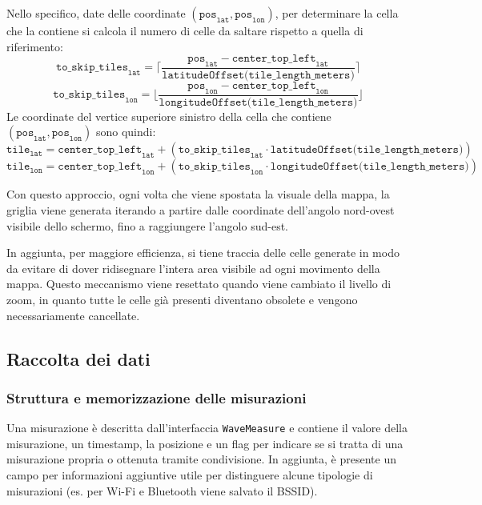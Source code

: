 \documentclass[11pt]{article}
\begin{document}
Nello specifico, date delle coordinate $(\texttt{pos}_{\texttt{lat}}, \texttt{pos}_{\texttt{lon}})$, per determinare la cella che la contiene si calcola il numero di celle da saltare rispetto a quella di riferimento: 
\begin{equation*}
    \texttt{to\_skip\_tiles}_\texttt{lat} =
        \lceil \frac{\texttt{pos}_{\texttt{lat}} - \texttt{center\_top\_left}_{\texttt{lat}}}{\texttt{latitudeOffset(tile\_length\_meters)}} \rceil
\end{equation*}
\begin{equation*}
    \texttt{to\_skip\_tiles}_\texttt{lon} =
        \lfloor \frac{\texttt{pos}_{\texttt{lon}} - \texttt{center\_top\_left}_{\texttt{lon}}}{\texttt{longitudeOffset(tile\_length\_meters)}} \rfloor
\end{equation*}
Le coordinate del vertice superiore sinistro della cella che contiene $(\texttt{pos}_{\texttt{lat}}, \texttt{pos}_{\texttt{lon}})$ sono quindi:
\begin{equation*}
    \texttt{tile}_\texttt{lat} = \texttt{center\_top\_left}_{\texttt{lat}} + (\texttt{to\_skip\_tiles}_\texttt{lat} \cdot \texttt{latitudeOffset(tile\_length\_meters)})
\end{equation*}
\begin{equation*}
    \texttt{tile}_\texttt{lon} = \texttt{center\_top\_left}_{\texttt{lon}} + (\texttt{to\_skip\_tiles}_\texttt{lon} \cdot \texttt{longitudeOffset(tile\_length\_meters)})
\end{equation*}

Con questo approccio, ogni volta che viene spostata la visuale della mappa, la griglia viene generata iterando a partire dalle coordinate dell'angolo nord-ovest visibile dello schermo, fino a raggiungere l'angolo sud-est. 

In aggiunta, per maggiore efficienza, si tiene traccia delle celle generate in modo da evitare di dover ridisegnare l'intera area visibile ad ogni movimento della mappa. Questo meccanismo viene resettato quando viene cambiato il livello di zoom, in quanto tutte le celle già presenti diventano obsolete e vengono necessariamente cancellate.



\subsection{Raccolta dei dati}

\subsubsection{Struttura e memorizzazione delle misurazioni}
Una misurazione è descritta dall'interfaccia \texttt{WaveMeasure} e contiene il valore della misurazione, un timestamp, la posizione e un flag per indicare se si tratta di una misurazione propria o ottenuta tramite condivisione. 
In aggiunta, è presente un campo per informazioni aggiuntive utile per distinguere alcune tipologie di misurazioni (es. per Wi-Fi e Bluetooth viene salvato il BSSID).
\end{document}

